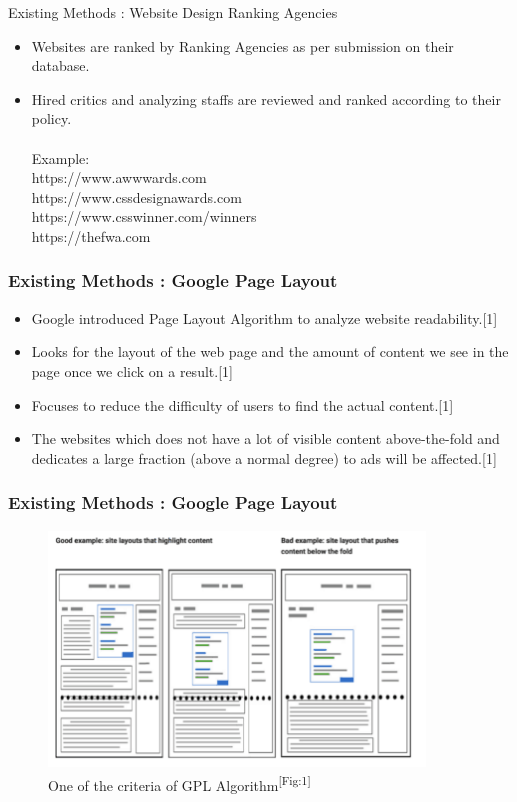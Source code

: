 \documentclass[11pt]{beamer}
\begin{document}
	\begin{frame}{Existing Methods : Website Design Ranking Agencies }
		\begin{itemize}
			\item Websites are ranked by Ranking Agencies as per submission on their database.
			\item Hired critics and analyzing staffs are reviewed and ranked according to their policy.
			\\\
			\\Example:\\
			https://www.awwwards.com\\

			https://www.cssdesignawards.com\\

			https://www.csswinner.com/winners\\

			https://thefwa.com\\
		\end{itemize}
	\end{frame}
	\begin{frame}
	\frametitle{{Existing Methods : Google Page Layout}}
	\begin{itemize}
		\item Google introduced Page Layout Algorithm to analyze website readability.[1]
		\item Looks for the layout of the web page and the amount of content we see in the page once we click on a result.[1]
		
		\item Focuses to reduce the difficulty of users to find the actual content.[1]
		
		\item  The websites which does not have a lot of visible content above-the-fold and dedicates a large fraction (above a normal degree) to ads will be affected.[1]
		
		
	\end{itemize}

	\end{frame}
\begin{frame}
	\frametitle{{Existing Methods : Google Page Layout}}
		\begin{figure}
		
		\includegraphics[width=10cm]{image/gpa.png}
		\caption{One of the criteria of GPL Algorithm\textsuperscript{[Fig:1]}}
		\label{fig1:gpa}
	\end{figure}
\end{frame}
\end{document}
